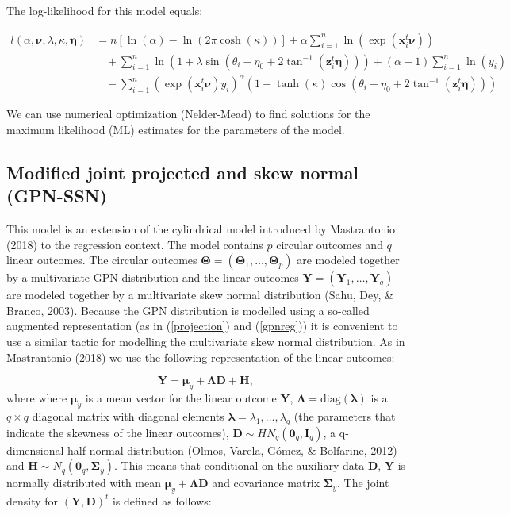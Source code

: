 \documentclass[11pt,]{article}
\begin{document}
The log-likelihood for this model equals:

\begin{align}\label{WeiSSVMLikelihood}
l(\alpha, \boldsymbol{\nu}, \lambda, \kappa, \boldsymbol{\eta}) 
   &= n[\ln(\alpha) - \ln(2\pi\cosh(\kappa))] + \alpha \sum^{n}_{i = 1} \ln(\exp(\boldsymbol{x}_i^t\boldsymbol{\nu})) \nonumber\\
   &\:\:\:\:+\sum^{n}_{i = 1} \ln(1 +\lambda\sin(\theta_i - \eta_0 + 2\tan^{-1}(\boldsymbol{z}_i^t\boldsymbol{\eta}))) 
   +(\alpha-1)\sum^{n}_{i = 1} \ln(y_i) \nonumber\\
   &\:\:\:\:-\sum^{n}_{i = 1}( \exp(\boldsymbol{x}_i^t\boldsymbol{\nu})y_i)^{\alpha}(1-\tanh(\kappa)\cos(\theta_i - \eta_0 + 2\tan^{-1}(\boldsymbol{z}_i^t\boldsymbol{\eta})))
\end{align}

We can use numerical optimization (Nelder-Mead) to find solutions for
the maximum likelihood (ML) estimates for the parameters of the model.

\subsection{Modified joint projected and skew normal (GPN-SSN)}\label{CL-GPN_multivariate}

This model is an extension of the cylindrical model introduced by
Mastrantonio (2018) to the regression context. The model contains \(p\)
circular outcomes and \(q\) linear outcomes. The circular outcomes
\(\boldsymbol{\Theta} = (\boldsymbol{\Theta}_1, \dots, \boldsymbol{\Theta}_p)\)
are modeled together by a multivariate GPN distribution and the linear
outcomes
\(\boldsymbol{Y} = (\boldsymbol{Y}_1, \dots, \boldsymbol{Y}_q)\) are
modeled together by a multivariate skew normal distribution (Sahu, Dey,
\& Branco, 2003). Because the GPN distribution is modelled using a
so-called augmented representation (as in (\ref{projection}) and
(\ref{gpnreg})) it is convenient to use a similar tactic for modelling
the multivariate skew normal distribution. As in Mastrantonio (2018) we
use the following representation of the linear outcomes:

\[\boldsymbol{Y} = \boldsymbol{\mu}_y + \boldsymbol{\Lambda}\boldsymbol{D} + \boldsymbol{H},\]
where where \(\boldsymbol{\mu}_y\) is a mean vector for the linear
outcome \(\boldsymbol{Y}\),
\(\boldsymbol{\Lambda} = \text{diag}(\boldsymbol{\lambda})\) is a
\(q \times q\) diagonal matrix with diagonal elements
\(\boldsymbol{\lambda} = \lambda_1, \dots, \lambda_q\) (the parameters
that indicate the skewness of the linear outcomes),
\(\boldsymbol{D} \sim HN_q(\boldsymbol{0}_q, \boldsymbol{I}_q)\), a
q-dimensional half normal distribution (Olmos, Varela, Gómez, \&
Bolfarine, 2012) and
\(\boldsymbol{H} \sim N_q(\boldsymbol{0}_q, \boldsymbol{\Sigma}_y)\).
This means that conditional on the auxiliary data \(\boldsymbol{D}\),
\(\boldsymbol{Y}\) is normally distributed with mean
\(\boldsymbol{\mu}_y + \boldsymbol{\Lambda}\boldsymbol{D}\) and
covariance matrix \(\boldsymbol{\Sigma}_y\). The joint density for
\((\boldsymbol{Y}, \boldsymbol{D})^t\) is defined as follows:
\end{document}
